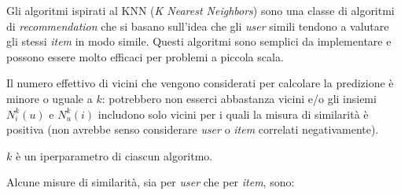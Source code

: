 Gli algoritmi ispirati al KNN (\textit{K Nearest Neighbors}) sono una classe di algoritmi di \textit{recommendation} che si basano sull'idea che gli \textit{user} simili tendono a valutare gli stessi \textit{item} in modo simile. Questi algoritmi sono semplici da implementare e possono essere molto efficaci per problemi a piccola scala.

Il numero effettivo di vicini che vengono considerati per calcolare la predizione è minore o uguale a $k$: potrebbero non esserci abbastanza vicini e/o gli insiemi $N_i^k(u)$ e $N_u^k(i)$ includono solo vicini per i quali la misura di similarità è positiva (non avrebbe senso considerare \textit{user} o \textit{item} correlati negativamente).

$k$ è un iperparametro di ciascun algoritmo.

Alcune misure di similarità, sia per \textit{user} che per \textit{item}, sono:
